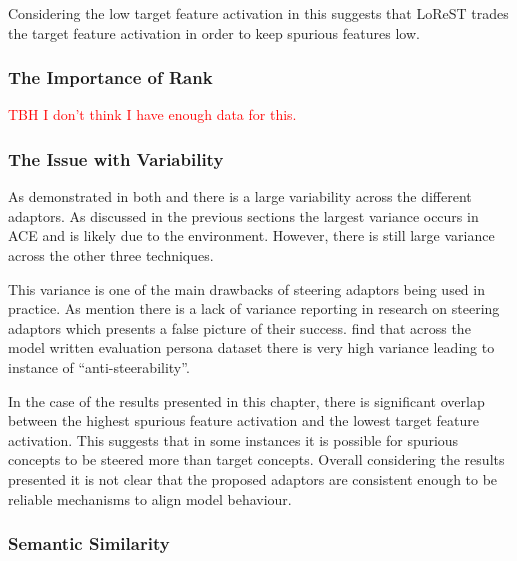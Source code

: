 Considering the low target feature activation in  this suggests that LoReST trades the target feature activation in order to keep spurious features low.

\subsubsection{The Importance of Rank}
\label{sec:rank-res}

\textcolor{red}{TBH I don't think I have enough data for this.}

\subsubsection{The Issue with Variability}
\label{sec:variability}

As demonstrated in both  and  there is a large variability across the different adaptors.
As discussed in the previous sections the largest variance occurs in ACE and is likely due to the environment.
However, there is still large variance across the other three techniques.

This variance is one of the main drawbacks of steering adaptors being used in practice.
As \citet{steerability} mention there is a lack of variance reporting in research on steering adaptors which presents a false picture of their success.
\citet{steerability} find that across the model written evaluation persona dataset \citep{mwe} there is very high variance leading to instance of ``anti-steerability''.

In the case of the results presented in this chapter, there is significant overlap between the highest spurious feature activation and the lowest target feature activation.
This suggests that in some instances it is possible for spurious concepts to be steered more than target concepts.
Overall considering the results presented it is not clear that the proposed adaptors are consistent enough to be reliable mechanisms to align model behaviour.

\subsubsection{Semantic Similarity}

